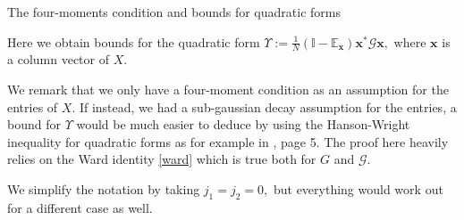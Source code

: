 \documentclass[11pt, a4paper, oneside]{book}
\numberwithin{equation}{chapter}
\newcommand{\E}{\mathbb E}
\newcommand{\x}{\mathbf{x}}
\begin{document}
\begin{section}{The four-moments condition and bounds for quadratic forms} \label{Qforms}

Here we obtain bounds for the quadratic form  $ \Upsilon := \frac{1}{N}(\mathbb{I} - \E_{\mathbf{x}} ) \mathbf{x}^* \mathcal{G} \mathbf{x}, $ where $\x$ is a column vector of $X$.

We remark that we only have a four-moment condition as an assumption for the entries of $X$. If instead, we had a sub-gaussian decay assumption for the entries, a bound for $\Upsilon$ would be much easier to deduce by using the Hanson-Wright inequality for quadratic forms as for example in \cite{cacciapuoti2013local}, page 5. The proof here heavily relies on the Ward identity \eqref{ward} which is true both for $G$ and $\mathcal{G}$.

We simplify the notation by taking $j_1=j_2=0,$ but everything would work out for a different case as well.


\end{section}
\end{document}
